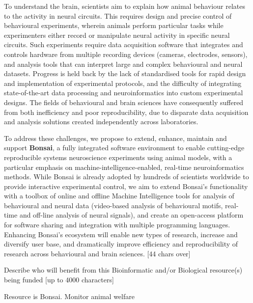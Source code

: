 To understand the brain, scientists aim to explain how animal behaviour relates to the activity in neural circuits. This requires design and precise control of behavioural experiments, wherein animals perform particular tasks while experimenters either record or manipulate neural activity in specific neural circuits. Such experiments require data acquisition software that integrates and controls hardware from multiple recording devices (cameras, electrodes, sensors), and analysis tools that can interpret large and complex behavioural and neural datasets. Progress is held back by the lack of standardised tools for rapid design and implementation of experimental protocols, and the difficulty of integrating state-of-the-art data processing and neuroinformatics into custom experimental designs. The fields of behavioural and brain sciences have consequently suffered from both inefficiency and poor reproducibility, due to disparate data acquisition and analysis solutions created independently across laboratories.   

To address these challenges, we propose  to  extend,  enhance,  maintain  and  support \textbf{Bonsai},  a  fully  integrated  software  environment  to enable cutting-edge reproducible systems neuroscience experiments using animal models, with a particular emphasis on machine-intelligence-enabled, real-time neuroinformatics methods. While Bonsai is already adopted by hundreds of scientists worldwide to provide interactive experimental control, we aim to extend Bonsai’s functionality with a toolbox of online and offline Machine Intelligence tools for analysis of behavioural and neural data (video-based analysis of behavioural motifs, real-time and off-line analysis of neural signals), and create an open-access platform for software sharing and integration with multiple programming languages. Enhancing Bonsai's ecosystem will enable new types of research, increase and diversify user base, and dramatically improve efficiency and reproducibility of research across behavioural and brain sciences.
[44 chars over]


Describe who will benefit from this Bioinformatic and/or Biological resource(s) being funded [up to 4000 characters]

Resource is Bonsai.
Monitor animal welfare


